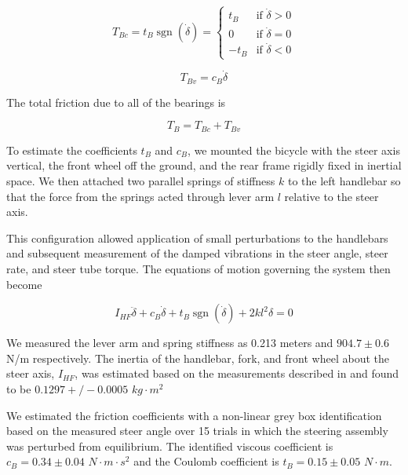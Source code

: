 \documentclass[10pt]{article}
\begin{document}
\begin{equation}
  T_{Bc} = t_B \operatorname{sgn}(\dot\delta) =
  \begin{cases}
    t_B  & \textrm{if $\dot{\delta}>0$}\\
    0    & \textrm{if $\dot{\delta}=0$}\\
    -t_B & \textrm{if $\dot{\delta}<0$}
  \end{cases}
  \label{eq:coulomb}
\end{equation}

\begin{equation}
  \label{eq:viscous}
  T_{Bv} = c_B \dot{\delta}
\end{equation}

The total friction due to all of the bearings is

\begin{equation}
  T_B = T_{Bc} + T_{Bv}
\end{equation}

To estimate the coefficients $t_B$ and $c_B$, we mounted the bicycle with the
steer axis vertical, the front wheel off the ground, and the rear frame rigidly
fixed in inertial space. We then attached two parallel springs of stiffness $k$
to the left handlebar so that the force from the springs acted through lever
arm $l$ relative to the steer axis.

This configuration allowed application of small perturbations to the handlebars
and subsequent measurement of the damped vibrations in the steer angle, steer
rate, and steer tube torque. The equations of motion governing the system then
become

\begin{equation}
  I_{HF} \ddot{\delta} + c_B \dot{\delta} + t_B
  \operatorname{sgn}(\dot{\delta}) + 2 k l^2 \delta = 0
\end{equation}

We measured the lever arm and spring stiffness as 0.213 meters and $904.7 \pm
0.6$ N/m respectively. The inertia of the handlebar, fork, and front wheel
about the steer axis, $I_{HF}$, was estimated based on the measurements
described in \cite{Moore2012} and found to be $0.1297+/-0.0005$ $kg\cdot m^2$

We estimated the friction coefficients with a non-linear grey box
identification based on the measured steer angle over 15 trials in which the
steering assembly was perturbed from equilibrium. The identified viscous
coefficient is $c_B = 0.34 \pm 0.04$ $N \cdot m \cdot s^2$ and the Coulomb
coefficient is $t_B = 0.15 \pm 0.05$ $N \cdot m$.
\end{document}
